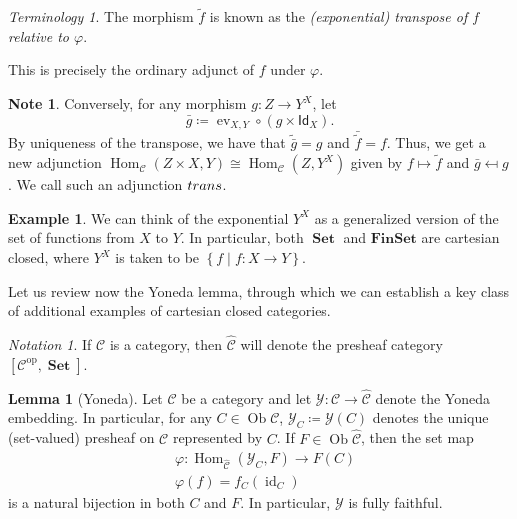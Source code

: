 \documentclass[10pt,letterpaper,cm]{nupset}
\theoremstyle{definition}
\newtheorem{exmp}[definition]{Example}
\newtheorem{note}[definition]{Note}
\theoremstyle{theorem}
\newtheorem{lemma}[definition]{Lemma}
\theoremstyle{remark}
\newtheorem*{notation}{Notation}
\newtheorem*{term}{Terminology}
\DeclareMathOperator{\ob}{Ob}
\DeclareMathOperator{\ev}{ev}
\newcommand{\id}{\mathsf{Id}}
\newcommand{\0}{\mathbf{0}}
\newcommand{\1}{\mathbf{1}}
\newcommand{\2}{\mathbf{2}}
\DeclareMathOperator{\op}{op}
\DeclareMathOperator{\set}{\mathbf{Set}}
\renewcommand{\c}{\mathscr{C}}
\DeclareMathOperator{\Hom}{Hom}
\DeclareMathOperator{\idd}{id}
\DeclareMathOperator{\trans}{\mathnormal{trans}}
\begin{document}
\begin{term}
The morphism $\tilde{f}$ is known as the \textit{(exponential) transpose of $f$ relative to $\varphi$}.
\end{term}

This is precisely the ordinary adjunct of $f$ under $\varphi$.

\begin{note}\label{trans}
Conversely, for any morphism $g: Z \to Y^X$, let $$\bar{g} \coloneqq \ev_{X, Y} \circ \left(g \times \id_X\right).$$ By uniqueness of the transpose, we have that $\tilde{\bar{g}} = g$ and $\bar{\tilde{f}} = f$. Thus, we get a new adjunction $\Hom_{\c}\left(Z \times X, Y\right) \cong \Hom_{\c}\left(Z, Y^X\right)$ given by $f \mapsto  \tilde{f}$ and $\bar{g} \mapsfrom g$. We call such an adjunction $\trans$.
\end{note}

\smallskip

\begin{exmp} We can think of the exponential $Y^X$  as a generalized version of the set of functions from $X$ to $Y$. In particular, both
 $\set$ and $\mathbf{FinSet}$ are cartesian closed, where $Y^X$ is taken to be $\left\{f \mid f: X \to Y\right\}$.
\end{exmp}

\smallskip

Let us review now the Yoneda lemma, through which we can  establish a key class of additional examples of cartesian closed categories.

\begin{notation}
If $\c$ is a category, then $\widehat{\c}$ will denote the presheaf category $ \left[\c^{\op}, \set\right]$.
\end{notation}

\begin{lemma}[Yoneda]\label{Yoneda}
Let $\c$ be a category and let $\mathcal{Y}: \c \to \widehat{\c}$ denote the Yoneda embedding. In particular, for any $C\in \ob{\c}$, $\mathcal{Y}_C\coloneqq \mathcal{Y}(C)$ denotes the unique (set-valued) presheaf on $\c$ represented by $C$. If $F \in \ob{\widehat{\c}}$, then the set map 
\begin{align*}
& \varphi:  \Hom_{\widehat{\c}}(\mathcal{Y}_C, F) \to F(C)
\\ & \varphi(f) = f_C\left(\idd_C\right)
\end{align*}
 is a natural bijection in both $C$ and $F$. In particular, $\mathcal{Y}$ is fully faithful.
\end{lemma}
\end{document}

